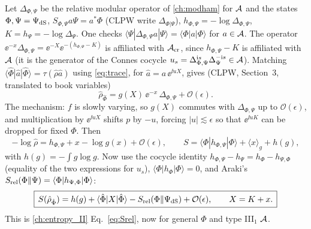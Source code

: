 Let $\Delta_{\Phi,\Psi}$ be the relative modular operator of \cref{ch:modham} for $\mathcal{A}$ and the states $\Phi,\Psi=\Psi_{\rm dS}$, $S_{\Phi,\Psi}a\Psi=a^*\Phi$ (CLPW write $\Delta_{\Phi|\Psi}$), $h_{\Phi,\Psi}=-\log\Delta_{\Phi,\Psi}$, $K=h_\Psi=-\log\Delta_\Psi$. One checks $\langle\Psi|\Delta_{\Phi,\Psi}a|\Psi\rangle=\langle\Phi|a|\Phi\rangle$ for $a\in\mathcal{A}$. The operator $\ee^{-x}\Delta_{\Phi,\Psi}=\ee^{-X}\ee^{-(h_{\Phi,\Psi}-K)}$ is affiliated with $\mathcal{A}_{\rm cr}$, since $h_{\Phi,\Psi}-K$ is affiliated with $\mathcal{A}$ (it is the generator of the Connes cocycle $u_s=\Delta_{\Phi,\Psi}^{\mathrm{i} s}\Delta_\Psi^{-\mathrm{i} s}\in\mathcal{A}$). Matching $\langle\hat\Phi|\hat a|\hat\Phi\rangle=\tau(\hat\rho\hat a)$ using \eqref{eq:trace}, for $\hat a=a\,\ee^{\ii u X}$, gives (CLPW, Section~3, translated to book variables)
\begin{equation}
\hat\rho_{\hat\Phi}=g(X)\,\ee^{-x}\,\Delta_{\Phi,\Psi}+\mathcal O(\epsilon).\label{eq:rhohat}
\end{equation}
The mechanism: $f$ is slowly varying, so $g(X)$ commutes with $\Delta_{\Phi,\Psi}$ up to $\mathcal O(\epsilon)$, and multiplication by $\ee^{\ii uX}$ shifts $p$ by $-u$, forcing $|u|\lesssim\epsilon$ so that $\ee^{\ii uK}$ can be dropped for fixed $\Phi$. Then
\begin{equation}
-\log\hat\rho=h_{\Phi,\Psi}+x-\log g(x)+\mathcal O(\epsilon),\qquad
S=\langle\Phi|h_{\Phi,\Psi}|\Phi\rangle+\langle x\rangle_g+h(g),
\end{equation}
with $h(g)=-\int g\log g$. Now use the cocycle identity $h_{\Phi,\Psi}-h_\Psi=h_\Phi-h_{\Psi,\Phi}$ (equality of the two expressions for $u_s$), $\langle\Phi|h_\Phi|\Phi\rangle=0$, and Araki's $S_{\rm rel}(\Phi\|\Psi)=\langle\Phi|h_{\Psi,\Phi}|\Phi\rangle$:
\begin{equation}
\boxed{\,S(\hat\rho_{\hat\Phi})=h(g)+\langle\hat\Phi|X|\hat\Phi\rangle-S_{\rm rel}(\Phi\|\Psi_{\rm dS})+\mathcal O(\epsilon),\qquad X=K+x.\,}\label{eq:Sformula}
\end{equation}
This is \cref{ch:entropy_II} Eq.~\eqref{eq:Srel}, now for general $\Phi$ and type III$_1$ $\mathcal{A}$.

